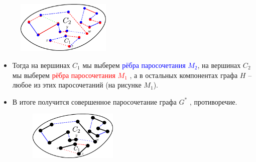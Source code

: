 \begin{frame}[t]
                \begin{figure}[h]
                    \centering
                    \includegraphics[width=0.4\textwidth]{images/case1}
                    \label{fig:case1}
                \end{figure}

            \begin{itemize}
                \item Тогда на вершинах $C_1$ мы выберем \textcolor{blue}{рёбра паросочетания $M_2$}, на вершинах $C_2$ мы выберем \textcolor{red}{рёбра паросочетания $M_1$ }, а в остальных компонентах графа $H$ -- любое из этих паросочетаний (на рисунке $M_1$).

                \item В итоге получится совершенное паросочетание графа
$G^*$ , противоречие.
                \begin{figure}[h]
                    \centering
                    \includegraphics[width=0.4\textwidth]{images/case1_counterproof}
                    \label{fig:case1_counterproof}
                \end{figure}
            \end{itemize}
\end{frame}

